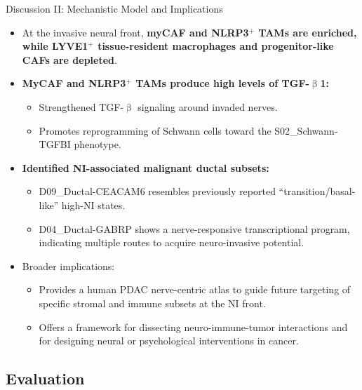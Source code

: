 \documentclass[10pt]{beamer}
\theoremstyle{plain}
\begin{document}
\begin{frame}{Discussion II: Mechanistic Model and Implications}
  \begin{itemize}
    \item At the invasive neural front, \textbf{myCAF and NLRP3\(^+\) TAMs are enriched, while LYVE1\(^+\) tissue-resident macrophages and progenitor-like CAFs are depleted}.
    \item \textbf{MyCAF and NLRP3\(^+\) TAMs produce high levels of TGF-\(\upbeta\)1:}
      \begin{itemize}
        \item Strengthened TGF-\(\upbeta\) signaling around invaded nerves.
        \item Promotes reprogramming of Schwann cells toward the S02\_Schwann-TGFBI phenotype.
      \end{itemize}
    \item \textbf{Identified NI-associated malignant ductal subsets:}
      \begin{itemize}
        \item D09\_Ductal-CEACAM6 resembles previously reported “transition/basal-like” high-NI states.
        \item D04\_Ductal-GABRP shows a nerve-responsive transcriptional program, indicating multiple routes to acquire neuro-invasive potential.
      \end{itemize}
    \item Broader implications:
      \begin{itemize}
        \item Provides a human PDAC nerve-centric atlas to guide future targeting of specific stromal and immune subsets at the NI front.
        \item Offers a framework for dissecting neuro-immune-tumor interactions and for designing neural or psychological interventions in cancer.
      \end{itemize}
  \end{itemize}
\end{frame}

\subsection{Evaluation}
\end{document}
